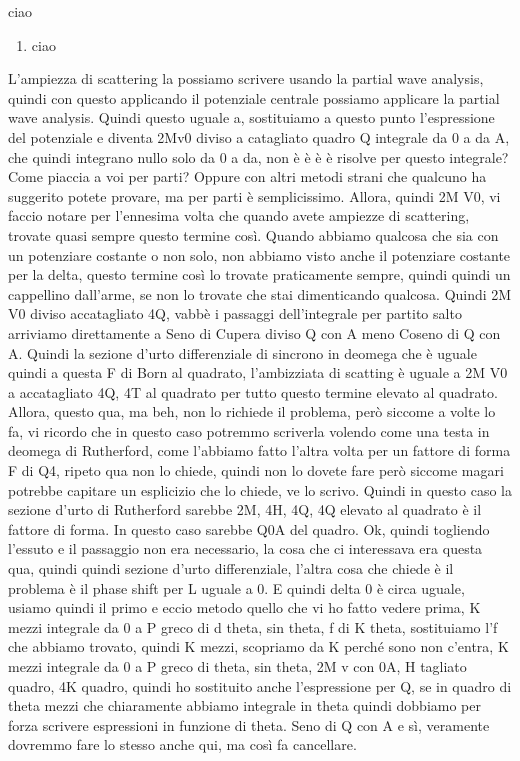 {\begin{esercizio}
   ciao
   \begin{enumerate}[label=\alph*), leftmargin=0.6cm]
      \item ciao
   \end{enumerate}
\end{esercizio}
\begin{soluzione}
   L'ampiezza di scattering la possiamo scrivere usando la partial wave analysis, quindi con questo applicando il potenziale centrale possiamo applicare la partial wave analysis. Quindi questo uguale a, sostituiamo a questo punto l'espressione del potenziale e diventa 2Mv0 diviso a catagliato quadro Q integrale da 0 a da A, che quindi integrano nullo solo da 0 a da, non è è è è risolve per questo integrale? Come piaccia a voi per parti? Oppure con altri metodi strani che qualcuno ha suggerito potete provare, ma per parti è semplicissimo. Allora, quindi 2M V0, vi faccio notare per l'ennesima volta che quando avete ampiezze di scattering, trovate quasi sempre questo termine così. Quando abbiamo qualcosa che sia con un potenziare costante o non solo, non abbiamo visto anche il potenziare costante per la delta, questo termine così lo trovate praticamente sempre, quindi quindi un cappellino dall'arme, se non lo trovate che stai dimenticando qualcosa. Quindi 2M V0 diviso accatagliato 4Q, vabbè i passaggi dell'integrale per partito salto arriviamo direttamente a Seno di Cupera diviso Q con A meno Coseno di Q con A. Quindi la sezione d'urto differenziale di sincrono in deomega che è uguale quindi a questa F di Born al quadrato, l'ambizziata di scatting è uguale a 2M V0 a accatagliato 4Q, 4T al quadrato per tutto questo termine elevato al quadrato. Allora, questo qua, ma beh, non lo richiede il problema, però siccome a volte lo fa, vi ricordo che in questo caso potremmo scriverla volendo come una testa in deomega di Rutherford, come l'abbiamo fatto l'altra volta per un fattore di forma F di Q4, ripeto qua non lo chiede, quindi non lo dovete fare però siccome magari potrebbe capitare un esplicizio che lo chiede, ve lo scrivo. Quindi in questo caso la sezione d'urto di Rutherford sarebbe 2M, 4H, 4Q, 4Q elevato al quadrato è il fattore di forma. In questo caso sarebbe Q0A del quadro. Ok, quindi togliendo l'essuto e il passaggio non era necessario, la cosa che ci interessava era questa qua, quindi quindi sezione d'urto differenziale, l'altra cosa che chiede è il problema è il phase shift per L uguale a 0. E quindi delta 0 è circa uguale, usiamo quindi il primo e eccio metodo quello che vi ho fatto vedere prima, K mezzi integrale da 0 a P greco di d theta, sin theta, f di K theta, sostituiamo l'f che abbiamo trovato, quindi K mezzi, scopriamo da K perché sono non c'entra, K mezzi integrale da 0 a P greco di theta, sin theta, 2M v con 0A, H tagliato quadro, 4K quadro, quindi ho sostituito anche l'espressione per Q, se in quadro di theta mezzi che chiaramente abbiamo integrale in theta quindi dobbiamo per forza scrivere espressioni in funzione di theta. Seno di Q con A e sì, veramente dovremmo fare lo stesso anche qui, ma così fa cancellare. 
   

\end{soluzione}}
